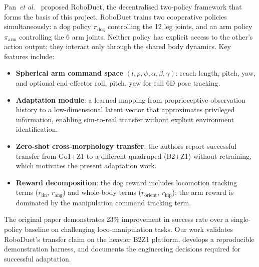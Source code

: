 Pan~\emph{et al.}~\cite{pan2024roboduet} proposed RoboDuet, the decentralised
two-policy framework that forms the basis of this project.
RoboDuet trains two cooperative policies simultaneously: a dog policy
$\pi_\text{dog}$ controlling the 12 leg joints, and an arm policy
$\pi_\text{arm}$ controlling the 6 arm joints.
Neither policy has explicit access to the other's action output; they
interact only through the shared body dynamics.
Key features include:
\begin{itemize}
  \item \textbf{Spherical arm command space} $(l, p, \psi, \alpha, \beta,
        \gamma)$: reach length, pitch, yaw, and optional end-effector roll,
        pitch, yaw for full 6D pose tracking.
  \item \textbf{Adaptation module}: a learned mapping from proprioceptive
        observation history to a low-dimensional latent vector that
        approximates privileged information, enabling sim-to-real transfer
        without explicit environment identification.
  \item \textbf{Zero-shot cross-morphology transfer}: the authors report
        successful transfer from Go1+Z1 to a different quadruped (B2+Z1)
        without retraining, which motivates the present adaptation work.
  \item \textbf{Reward decomposition}: the dog reward includes locomotion
        tracking terms ($r_\text{lin}$, $r_\text{ang}$) and whole-body
        terms ($r_\text{orient}$, $r_\text{hip}$); the arm reward is
        dominated by the manipulation command tracking term.
\end{itemize}

The original paper demonstrates 23\% improvement in success rate over a
single-policy baseline on challenging loco-manipulation tasks.
Our work validates RoboDuet's transfer claim on the heavier B2Z1 platform,
develops a reproducible demonstration harness, and documents the engineering
decisions required for successful adaptation.
